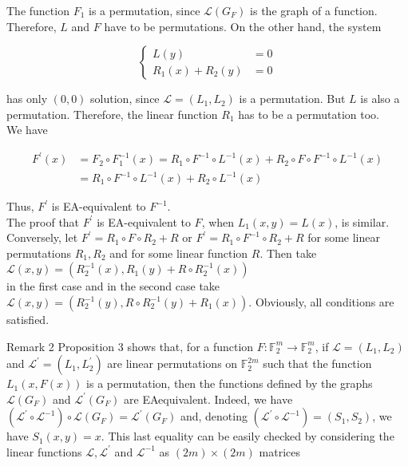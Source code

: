 \documentclass[10pt]{article}
\begin{document}
The function $F_{1}$ is a permutation, since $\mathcal{L}\left(G_{F}\right)$ is the graph of a function. Therefore, $L$ and $F$ have to be permutations. On the other hand, the system

$$
\begin{cases}L(y) & =0 \\ R_{1}(x)+R_{2}(y) & =0\end{cases}
$$

has only $(0,0)$ solution, since $\mathcal{L}=\left(L_{1}, L_{2}\right)$ is a permutation. But $L$ is also a permutation. Therefore, the linear function $R_{1}$ has to be a permutation too.\\
We have

$$
\begin{aligned}
F^{\prime}(x) & =F_{2} \circ F_{1}^{-1}(x)=R_{1} \circ F^{-1} \circ L^{-1}(x)+R_{2} \circ F \circ F^{-1} \circ L^{-1}(x) \\
& =R_{1} \circ F^{-1} \circ L^{-1}(x)+R_{2} \circ L^{-1}(x)
\end{aligned}
$$

Thus, $F^{\prime}$ is EA-equivalent to $F^{-1}$.\\
The proof that $F^{\prime}$ is EA-equivalent to $F$, when $L_{1}(x, y)=L(x)$, is similar.\\
Conversely, let $F^{\prime}=R_{1} \circ F \circ R_{2}+R$ or $F^{\prime}=R_{1} \circ F^{-1} \circ R_{2}+R$ for some linear permutations $R_{1}, R_{2}$ and for some linear function $R$. Then take $\mathcal{L}(x, y)=\left(R_{2}^{-1}(x), R_{1}(y)+R \circ R_{2}^{-1}(x)\right)$\\
in the first case and in the second case take $\mathcal{L}(x, y)=\left(R_{2}^{-1}(y), R \circ R_{2}^{-1}(y)+R_{1}(x)\right)$. Obviously, all conditions are satisfied.

Remark 2 Proposition 3 shows that, for a function $F: \mathbb{F}_{2}^{m} \rightarrow \mathbb{F}_{2}^{m}$, if $\mathcal{L}=\left(L_{1}, L_{2}\right)$ and $\mathcal{L}^{\prime}=\left(L_{1}, L_{2}^{\prime}\right)$ are linear permutations on $\mathbb{F}_{2}^{2 m}$ such that the function $L_{1}(x, F(x))$ is a permutation, then the functions defined by the graphs $\mathcal{L}\left(G_{F}\right)$ and $\mathcal{L}^{\prime}\left(G_{F}\right)$ are EAequivalent. Indeed, we have $\left(\mathcal{L}^{\prime} \circ \mathcal{L}^{-1}\right) \circ \mathcal{L}\left(G_{F}\right)=\mathcal{L}^{\prime}\left(G_{F}\right)$ and, denoting $\left(\mathcal{L}^{\prime} \circ \mathcal{L}^{-1}\right)=\left(S_{1}, S_{2}\right)$, we have $S_{1}(x, y)=x$. This last equality can be easily checked by considering the linear functions $\mathcal{L}, \mathcal{L}^{\prime}$ and $\mathcal{L}^{-1}$ as $(2 m) \times(2 m)$ matrices
\end{document}
